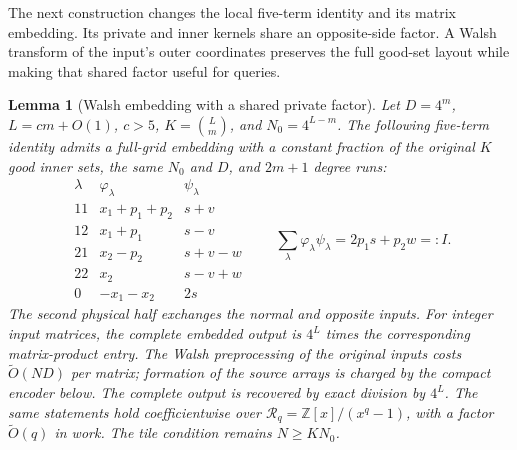 \documentclass[11pt]{article}
\newtheorem{lemma}[theorem]{Lemma}
\newcommand{\softO}{\widetilde O}
\begin{document}
The next construction changes the local five-term identity and its matrix
embedding. Its private and inner kernels share an opposite-side factor.
A Walsh transform of the input's outer coordinates preserves the full
good-set layout while making that shared factor useful for queries.

\begin{lemma}[Walsh embedding with a shared private factor]
\label{lem:aligned-walsh-embedding}
Let $D=4^m$, $L=cm+O(1)$, $c>5$, $K=\binom Lm$, and
$N_0=4^{L-m}$. The following five-term identity admits a full-grid
embedding with a constant fraction of the original $K$ good inner sets,
the same $N_0$ and $D$, and $2m+1$ degree runs:
\[
\begin{array}{c|c|c}
\lambda&\varphi_\lambda&\psi_\lambda\\\hline
11&x_1+p_1+p_2&s+v\\
12&x_1+p_1&s-v\\
21&x_2-p_2&s+v-w\\
22&x_2&s-v+w\\
0&-x_1-x_2&2s
\end{array}
\qquad
\sum_{\lambda}\varphi_\lambda\psi_\lambda
 =2p_1s+p_2w=:I.                                      \tag{A1}
\]
The second physical half exchanges the normal and opposite inputs.
For integer input matrices, the complete embedded output is $4^L$
times the corresponding matrix-product entry. The Walsh preprocessing
of the original inputs costs $\softO(ND)$ per matrix; formation of the
source arrays is charged by the compact encoder below. The complete output is recovered by exact
division by $4^L$. The same statements hold coefficientwise over
$\mathcal R_q=\mathbb Z[x]/(x^q-1)$, with a factor $\softO(q)$ in work.
The tile condition remains $N\ge KN_0$.
\end{lemma}
\end{document}

